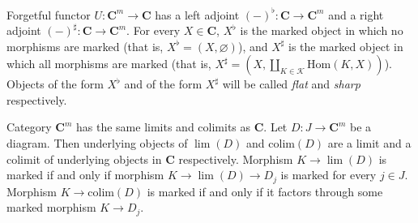 \documentclass[reqno]{amsart}
\theoremstyle{definition}
\theoremstyle{remark}
\newcommand{\cat}[1]{\mathbf{#1}}
\newcommand{\C}{\cat{C}}
\newcommand{\Hom}{\mathrm{Hom}}
\newcommand{\colim}{\mathrm{colim}}
\numberwithin{figure}{section}
\begin{document}
Forgetful functor $U : \C^m \to \C$ has a left adjoint $(-)^\flat : \C \to \C^m$ and a right adjoint $(-)^\sharp : \C \to \C^m$.
For every $X \in \C$, $X^\flat$ is the marked object in which no morphisms are marked (that is, $X^\flat = (X,\varnothing)$),
and $X^\sharp$ is the marked object in which all morphisms are marked (that is, $X^\sharp = (X,\coprod_{K \in \mathcal{K}} \Hom(K,X))$).
Objects of the form $X^\flat$ and of the form $X^\sharp$ will be called \emph{flat} and \emph{sharp} respectively.

Category $\C^m$ has the same limits and colimits as $\C$.
Let $D : J \to \C^m$ be a diagram.
Then underlying objects of $\lim(D)$ and $\colim(D)$ are a limit and a colimit of underlying objects in $\C$ respectively.
Morphism $K \to \lim(D)$ is marked if and only if morphism $K \to \lim(D) \to D_j$ is marked for every $j \in J$.
Morphism $K \to \colim(D)$ is marked if and only if it factors through some marked morphism $K \to D_j$.
\end{document}
